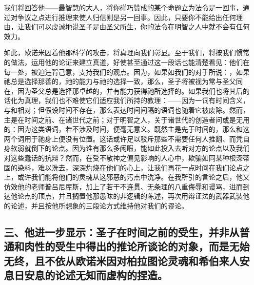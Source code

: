 我们将回答他——最智慧的大人，将你碰巧赞成的某个命题立为法令是一回事，通过对争议之点进行推理来使人归信则是另一回事。因此，只要你不能给出任何理由，让我们可以虔诚地说圣子是由圣父所生，你的法令在明智之人中就不会有任何效力。\par

如此，欧诺米因着他那科学的攻击，将真理向我们彰显。至于我们，将按我们惯常的做法，运用他的论证来建立真道，好使甚至通过这一段话也能清楚看见：他们在每一处，被迫违背己意，支持我们的观点。因为，如果如我们的对手所说：，如果祂总是选择那善的，祂的能力与祂的选择一致，那么，圣子将被视为常与圣父同在，因为圣父总是选择那卓越的，并有能力获得祂所选择的。如果我们也将其后的话化为真理，我们也不难使它们适应我们所持的教理：——因为一词有时间含义，与和相对；但假设时间不存在，那么表达时间间隔的语词也随着它被废除。然而，主是在时间之前、在诸世代之前；对于明智之人，关于诸世代的创造者问或是无用的：因为这类语词，若不涉及时间，便毫无意义。既然主是先于时间的，那么和这两个词用于祂身上便没有位置。这话或许足以驳斥那些不需要任何人推翻、而凭自身软弱就倒下的论点。因为谁有那么多闲暇，能如此投入去听对方的论点以及我们对这些蠢话的抗辩？然而，在受不敬神之偏见影响的人心中，欺骗如同某种根深蒂固的染料，难以洗去，深深灼烧在他们的心上，让我们再花一点时间在我们论点之上，或许我们能将他们的灵魂从这邪恶的污点中洗净。在我所引的言论之后，他又仿效他的老师普吕尼库斯，加上了若干不连贯、无条理的八重侮辱和谩骂，进而到达他论点的顶点，并且搁置他那愚昧的非逻辑的陈述，再次用辩证法的武器武装他的论述，并且按他所想象的三段论方式维持他对我们的谬论。\par


\subsection{三、他进一步显示：圣子在时间之前的受生，并非从普通和肉性的受生中得出的推论所谈论的对象，而是无始无终，且不依从欧诺米因对柏拉图论灵魂和希伯来人安息日安息的论述无知而虚构的捏造。}

